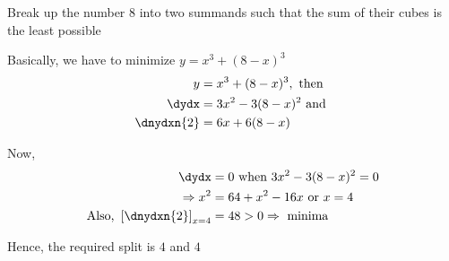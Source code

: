 
%
%
%
%
% 
% 

\question Break up the number 8 into two summands such that the sum of their cubes
is the least possible

\insertQR{}

\ifprintanswers
\fi

\begin{solution}
   Basically, we have to minimize $y = x^3 + (8-x)^3$
   \begin{align}
      y &= x^3 + (8-x)^3, \text{ then } \\
      \dydx &= 3x^2 - 3(8-x)^2 \text{ and } \\
      \dnydxn{2} &= 6x + 6(8-x)
   \end{align}
   
   Now, 
   \begin{align}
      \dydx &= 0 \text { when } 3x^2 - 3(8-x)^2 = 0 \\
      \Rightarrow x^2 &= 64 + x^2 -16x \text{ or } x = 4 \\
      \text{Also, }\left[\dnydxn{2}\right]_{x=4} &= 48 > 0 \Rightarrow \text{ minima }
   \end{align}
   
   Hence, the required split is $4$ and $4$
\end{solution}
